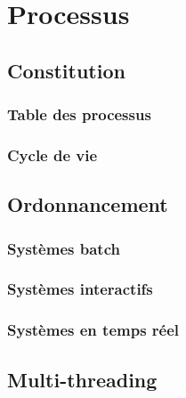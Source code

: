 \section{Processus}\label{sec:processus}

\subsection{Constitution}
\subsubsection{Table des processus}
\subsubsection{Cycle de vie}

\subsection{Ordonnancement}
\subsubsection{Systèmes batch}
\subsubsection{Systèmes interactifs}
\subsubsection{Systèmes en temps réel}

\subsection{Multi-threading}
